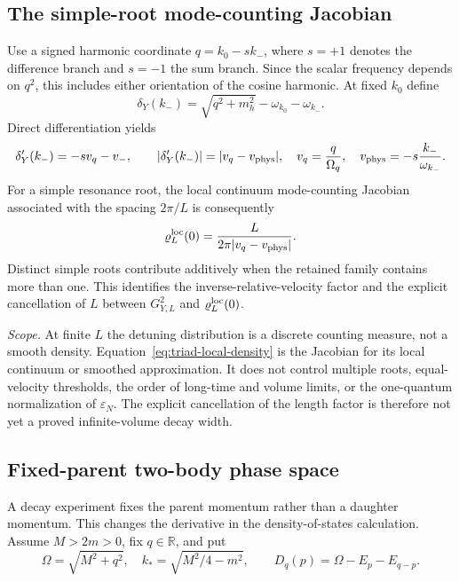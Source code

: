 \documentclass[11pt,a4paper,oneside]{book}
\theoremstyle{plain}
\theoremstyle{definition}
\theoremstyle{remark}
\newcommand{\R}{\mathbb R}
\newcommand{\src}[2]{\cite{#1}}
\newcommand{\scope}[1]{\par\smallskip\noindent\textit{Scope.} #1\par\smallskip}
\begin{document}
\subsection{The simple-root mode-counting Jacobian}
\label{sec:triad-density}
Use a signed harmonic coordinate $q=k_0-s k_-$, where $s=+1$ denotes
the difference branch and $s=-1$ the sum branch.  Since the scalar
frequency depends on $q^2$, this includes either orientation of the
cosine harmonic.  At fixed $k_0$ define
\begin{equation}
 \delta_Y(k_-)=\sqrt{q^2+m_h^2}-\omega_{k_0}-\omega_{k_-}.
 \label{eq:circle-detuning}
\end{equation}
Direct differentiation yields
\begin{equation}
 \delta_Y'(k_-)=-s v_q-v_-,\qquad
 |\delta_Y'(k_-)|=|v_q-v_{\rm phys}|,
 \quad v_q=\frac q{\Omega_q},\quad
 v_{\rm phys}=-s\frac{k_-}{\omega_{k_-}}.
 \label{eq:relative-velocity-jacobian}
\end{equation}
For a simple resonance root, the local continuum mode-counting Jacobian
associated with the spacing $2\pi/L$ is consequently
\begin{equation}
 \varrho_L^{\rm loc}(0)=
 \frac{L}{2\pi|v_q-v_{\rm phys}|}.
 \label{eq:triad-local-density}
\end{equation}
Distinct simple roots contribute additively when the retained family
contains more than one.  This identifies the inverse-relative-velocity
factor and the explicit cancellation of $L$ between $G_{Y,L}^2$ and
$\varrho_L^{\rm loc}(0)$.
\src{R20}{thm:v20v41-density,thm:v20v41-scalings}

\scope{At finite $L$ the detuning distribution is a discrete counting
measure, not a smooth density.  Equation~\eqref{eq:triad-local-density}
is the Jacobian for its local continuum or smoothed approximation.
It does not control multiple roots, equal-velocity thresholds, the order
of long-time and volume limits, or the one-quantum normalization of
$\varepsilon_N$.  The explicit cancellation of the length factor is
therefore not yet a proved infinite-volume decay width.}

\subsection{Fixed-parent two-body phase space}
\label{sec:fixed-parent-density}
A decay experiment fixes the parent momentum rather than a daughter
momentum.  This changes the derivative in the density-of-states
calculation.  Assume $M>2m>0$, fix $q\in\R$, and put
\begin{equation}
 \Omega=\sqrt{M^2+q^2},\quad k_* =\sqrt{M^2/4-m^2},\qquad
 D_q(p)=\Omega-E_p-E_{q-p}.
 \label{eq:fixed-parent-detuning}
\end{equation}
\end{document}
